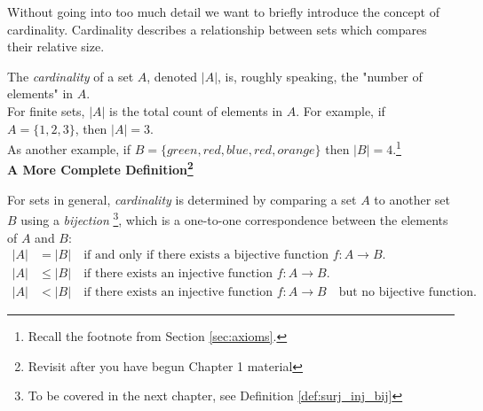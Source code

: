 \noindent Without going into too much detail we want to briefly introduce the concept of cardinality. Cardinality describes a relationship between sets which compares their relative size.
\begin{definition}
    The \textit{cardinality} of a set $A$, denoted $|A|$, is, roughly speaking, the "number of elements" in $A$. \\

    \noindent For finite sets, $|A|$ is the total count of elements in $A$. For example, if $A = \{1, 2, 3\}$, then $|A| = 3$. \\
    \noindent As another example, if $B=\{green, red, blue, red, orange\}$ then $|B|=4$.\footnote{Recall the footnote from Section \ref{sec:axioms}.}\\ 
    
    \noindent \textbf{A More Complete Definition\footnote{Revisit after you have begun Chapter 1 material}} 

    \noindent For sets in general, \textit{cardinality} is determined by comparing a set $A$ to another set $B$ using a \textit{bijection} \footnote{To be covered in the next chapter, see Definition \ref{def:surj_inj_bij}}, which is a one-to-one correspondence between the elements of $A$ and $B$:
    \begin{align}
        |A| &= |B| \quad \text{if and only if there exists a bijective function } f: A \to B. \nonumber \\
        |A|&\leq |B| \quad \text{if there exists an injective function }f:A \to B. \nonumber \\
        |A|&<|B| \quad \text{if there exists an injective function } f:A \to B \quad \text{but no bijective function.} \nonumber
    \end{align}
\end{definition}


